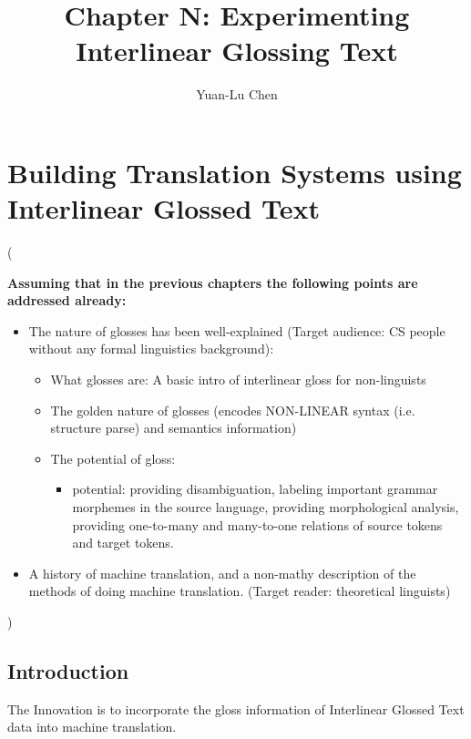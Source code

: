 \documentclass[a4paper]{article}
\title{Chapter N: Experimenting Interlinear Glossing Text}
\author{Yuan-Lu Chen}
\begin{document}


\maketitle

\chapter{Building Translation Systems using Interlinear Glossed Text}
\label{chap:cake}

(

\textbf{Assuming that in the previous chapters the following points are addressed already:} 
\begin{itemize}
\item The nature of glosses has been well-explained  (Target audience: CS people without any formal linguistics background):
	\begin{itemize}
	\item What glosses are: A basic intro of interlinear gloss for non-linguists
    \item The golden nature of glosses (encodes NON-LINEAR syntax (i.e. structure parse) and semantics information) 
    \item The potential of gloss:	
		\begin{itemize}
		\item potential: providing disambiguation, labeling important grammar morphemes in the source language, providing morphological analysis, providing one-to-many and many-to-one relations of source tokens and target tokens.  
		\end{itemize}
	\end{itemize}
\item A history of machine translation, and a non-mathy description of the methods of doing machine translation. (Target reader: theoretical linguists)
\end{itemize}

                 
)


\section{Introduction}
The Innovation is to incorporate the gloss information of Interlinear Glossed Text data into machine translation. 
\end{document}
